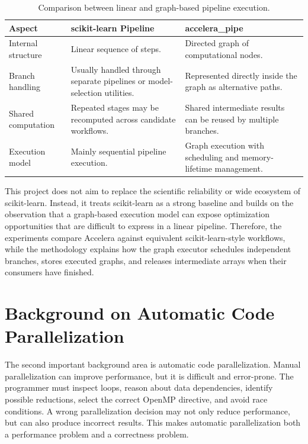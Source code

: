 \documentclass[12pt,a4paper,oneside]{report}
\newcommand{\systemname}{Accelera}
\begin{document}
\begin{table}[H]
\centering
\normalsize
\renewcommand{\arraystretch}{1.08}
\setlength{\tabcolsep}{5pt}
\caption{Comparison between linear and graph-based pipeline execution.}
\label{tab:pipeline-background-comparison}
\begin{tabularx}{\textwidth}{p{}XX}
\toprule
\textbf{Aspect} & \textbf{scikit-learn} Pipeline & \textbf{accelera\_pipe} \\
\midrule
Internal structure &
Linear sequence of steps. &
Directed graph of computational nodes. \\
\midrule
Branch handling &
Usually handled through separate pipelines or model-selection utilities. &
Represented directly inside the graph as alternative paths. \\
\midrule
Shared computation &
Repeated stages may be recomputed across candidate workflows. &
Shared intermediate results can be reused by multiple branches. \\
\midrule
Execution model &
Mainly sequential pipeline execution. &
Graph execution with scheduling and memory-lifetime management. \\
\bottomrule
\end{tabularx}
\end{table}

This project does not aim to replace the scientific reliability or wide
ecosystem of scikit-learn. Instead, it treats scikit-learn as
a strong baseline and builds on the observation that a graph-based execution
model can expose optimization opportunities that are difficult to express in a
linear pipeline. Therefore, the experiments compare \systemname{} against
equivalent scikit-learn-style workflows, while the methodology explains
how the graph executor schedules independent branches, stores executed graphs,
and releases intermediate arrays when their consumers have finished.

\section{Background on Automatic Code Parallelization}

The second important background area is automatic code parallelization. Manual
parallelization can improve performance, but it is difficult and error-prone. The
programmer must inspect loops, reason about data dependencies, identify possible
reductions, select the correct OpenMP directive, and avoid race conditions. A
wrong parallelization decision may not only reduce performance, but can also
produce incorrect results. This makes automatic parallelization both a
performance problem and a correctness problem.
\end{document}
